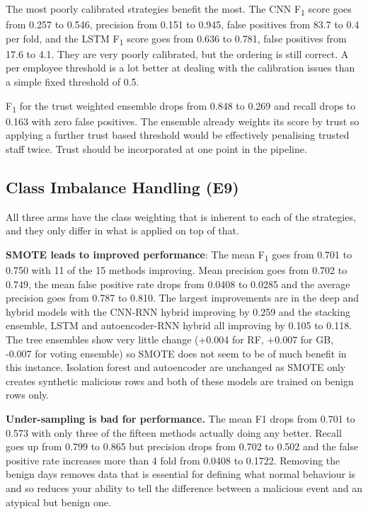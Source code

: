 \documentclass[a4paper,12pt]{article}
\newcommand{\resultinput}[1]{{\let\small\footnotesize\setlength{\tabcolsep}{4pt}}}
\begin{document}
The most poorly calibrated strategies benefit the most. The CNN F\textsubscript{1} score goes from 0.257 to 0.546, precision from 0.151 to 0.945, false positives from 83.7 to 0.4 per fold, and the LSTM F\textsubscript{1} score goes from 0.636 to 0.781, false positives from 17.6 to 4.1. They are very poorly calibrated, but the ordering is still correct. A per employee threshold is a lot better at dealing with the calibration issues than a simple fixed threshold of 0.5.

F\textsubscript{1} for the trust weighted ensemble drops from 0.848 to 0.269 and recall drops to 0.163 with zero false positives. The ensemble already weights its score by trust so applying a further trust based threshold would be effectively penalising trusted staff twice. Trust should be incorporated at one point in the pipeline.

\subsection{Class Imbalance Handling (E9)}
\label{sec:8.7}

All three arms have the class weighting that is inherent to each of the strategies, and they only differ in what is applied on top of that.

\resultinput{tables/imbalance}

\textbf{SMOTE leads to improved performance}: The mean F\textsubscript{1} goes from 0.701 to 0.750 with 11 of the 15 methods improving. Mean precision goes from 0.702 to 0.749, the mean false positive rate drops from 0.0408 to 0.0285 and the average precision goes from 0.787 to 0.810. The largest improvements are in the deep and hybrid models with the CNN-RNN hybrid improving by 0.259 and the stacking ensemble, LSTM and autoencoder-RNN hybrid all improving by 0.105 to 0.118. The tree ensembles show very little change (+0.004 for RF, +0.007 for GB, -0.007 for voting ensemble) so SMOTE does not seem to be of much benefit in this instance. Isolation forest and autoencoder are unchanged as SMOTE only creates synthetic malicious rows and both of these models are trained on benign rows only.

\textbf{Under-sampling is bad for performance.} The mean F1 drops from 0.701 to 0.573 with only three of the fifteen methods actually doing any better. Recall goes up from 0.799 to 0.865 but precision drops from 0.702 to 0.502 and the false positive rate increases more than 4 fold from 0.0408 to 0.1722. Removing the benign days removes data that is essential for defining what normal behaviour is and so reduces your ability to tell the difference between a malicious event and an atypical but benign one.
\end{document}
